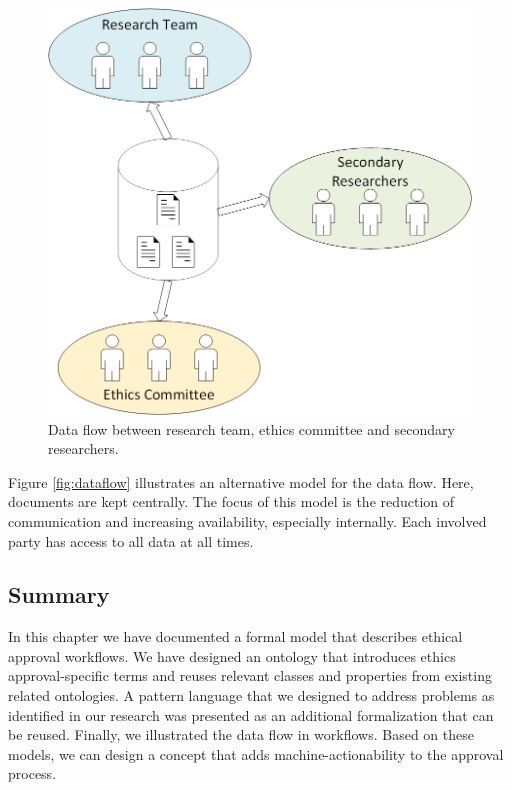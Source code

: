 \documentclass[10pt]{article}
\begin{document}
\begin{figure}
\centering
	\includegraphics[width=1\textwidth]{img/dataflownew.png}
	\caption{Data flow between research team, ethics committee and  secondary researchers.}
	\label{fig:dataflownew}
\end{figure}

Figure \ref{fig:dataflow} illustrates an alternative model for the data flow. Here, documents are kept centrally. The focus of this model is the reduction of communication and increasing availability, especially internally. Each involved party has access to all data at all times. 

\subsection{Summary}
In this chapter we have documented a formal model that describes ethical approval workflows. We have designed an ontology that introduces ethics approval-specific terms and reuses relevant classes and properties from existing related ontologies. A pattern language that we designed to address problems as identified in our research was presented as an additional formalization that can be reused. Finally, we illustrated the data flow in workflows. Based on these models, we can design a concept that adds machine-actionability to the approval process.

\newpage
\end{document}

